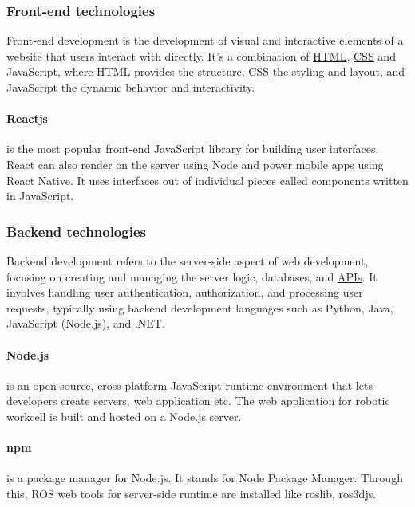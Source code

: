 
\subsubsection{Front-end technologies}
\label{subsubsec:frontend}
Front-end development is the development of visual and interactive elements of a website that users interact with directly. It's a combination
of \hyperref[acro:HTML5]{HTML}, \hyperref[acro:CSS]{CSS} and JavaScript, where \hyperref[acro:HTML5]{HTML} provides the structure, \hyperref[acro:CSS]{CSS} the styling and layout, and JavaScript the dynamic behavior and interactivity.
\cite{frontend}

\paragraph{Reactjs}
\label{par:reactjs}
is the most popular front-end JavaScript library for building user interfaces. React can also render on the server using Node and power mobile
apps using React Native. It uses interfaces out of individual pieces called components written in JavaScript.
\cite{reactjs}

\subsubsection{Backend technologies}
\label{subsubsec:backend}

Backend development refers to the server-side aspect of web development, focusing on creating and managing the server logic, databases,
and \hyperref[acro:API]{APIs}. It involves handling user authentication, authorization, and processing user requests, typically using backend development
languages such as Python, Java, JavaScript (Node.js), and .NET. \cite{backend}

\paragraph{Node.js}
\label{par:nodejs}
is an open-source, cross-platform JavaScript runtime environment that lets developers create servers, web application etc.
The web application for robotic workcell is built and hosted on a Node.js server. \cite{nodejs}

\paragraph{npm}
\label{par:npm}
is a package manager for Node.js. It stands for Node Package Manager. Through this, ROS web tools for server-side runtime are installed like
roslib, ros3djs. \cite{npm}

